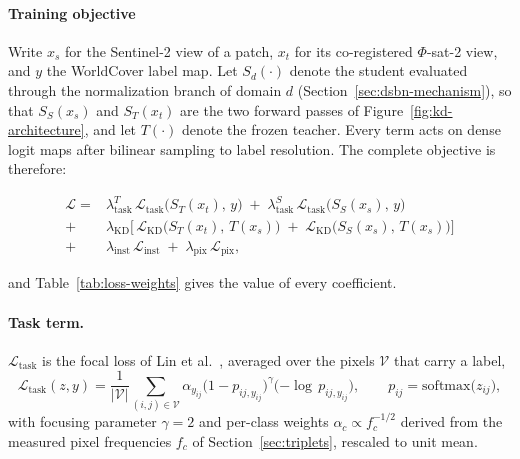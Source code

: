 \paragraph{Training objective}
\label{sec:kd-objective}

Write $x_s$ for the Sentinel-2 view of a patch, $x_t$ for its co-registered $\Phi$-sat-2 view, and $y$ the WorldCover label map.
Let $S_d(\cdot)$ denote the student evaluated through the normalization branch of domain $d$ (Section~\ref{sec:dsbn-mechanism}), so that $S_S(x_s)$ and $S_T(x_t)$ are the two forward passes of Figure~\ref{fig:kd-architecture}, and let $T(\cdot)$ denote the frozen teacher.
Every term acts on dense logit maps after bilinear sampling to label resolution.
The complete objective is therefore:

\begin{equation}
    \begin{aligned}
        \mathcal{L} = {} & \lambda^{T}_{\mathrm{task}}\, \mathcal{L}_{\mathrm{task}}\big(S_T(x_t),\, y\big)
        \;+\; \lambda^{S}_{\mathrm{task}}\, \mathcal{L}_{\mathrm{task}}\big(S_S(x_s),\, y\big)                 \\
        {} + {}          & \lambda_{\mathrm{KD}} \Big[\, \mathcal{L}_{\mathrm{KD}}\big(S_T(x_t),\, T(x_s)\big)
        \;+\; \mathcal{L}_{\mathrm{KD}}\big(S_S(x_s),\, T(x_s)\big) \Big]                                      \\
        {} + {}          & \lambda_{\mathrm{inst}}\, \mathcal{L}_{\mathrm{inst}}
        \;+\; \lambda_{\mathrm{pix}}\, \mathcal{L}_{\mathrm{pix}},
    \end{aligned}
    \label{eq:kd-total}
\end{equation}

\noindent and Table~\ref{tab:loss-weights} gives the value of every coefficient.

\paragraph{Task term.}
$\mathcal{L}_{\mathrm{task}}$ is the focal loss of Lin et al.~\cite{lin2017focal}, averaged over the pixels $\mathcal{V}$ that carry a label,
\begin{equation}
    \mathcal{L}_{\mathrm{task}}(z, y) = \frac{1}{|\mathcal{V}|} \sum_{(i,j) \in \mathcal{V}}
    \alpha_{y_{ij}} \big(1 - p_{ij, y_{ij}}\big)^{\gamma} \big({-\log\, p_{ij, y_{ij}}}\big),
    \qquad p_{ij} = \mathrm{softmax}\big(z_{ij}\big),
    \label{eq:focal}
\end{equation}
with focusing parameter $\gamma = 2$ and per-class weights $\alpha_c \propto f_c^{-1/2}$ derived from the measured pixel frequencies $f_c$ of Section~\ref{sec:triplets}, rescaled to unit mean.

